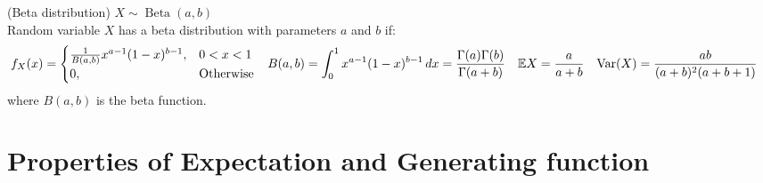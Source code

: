 \documentclass{huhtakm-template-book}
\newcommand{\expect}{\mathbb{E}}
\DeclareMathOperator{\Beta}{Beta}
\DeclareMathOperator{\Var}{Var}
\begin{document}
\begin{seg}(Beta distribution) $X\sim\Beta(a,b)$\\
	Random variable $X$ has a beta distribution with parameters $a$ and $b$ if:
	\begin{align*}
		f_{X}(x)&=\begin{cases}
			\frac{1}{B(a,b)}x^{a-1}(1-x)^{b-1}, &0<x<1\\
			0, &\text{Otherwise}
		\end{cases} & B(a,b)&=\intlu{0}{1}x^{a-1}(1-x)^{b-1}\,dx=\frac{\Gamma(a)\Gamma(b)}{\Gamma(a+b)} & \expect{X}&=\frac{a}{a+b} & \Var(X)&=\frac{ab}{(a+b)^{2}(a+b+1)}
	\end{align*}
	where $B(a,b)$ is the beta function.
\end{seg}

\chapter{Properties of Expectation and Generating function}
\end{document}
